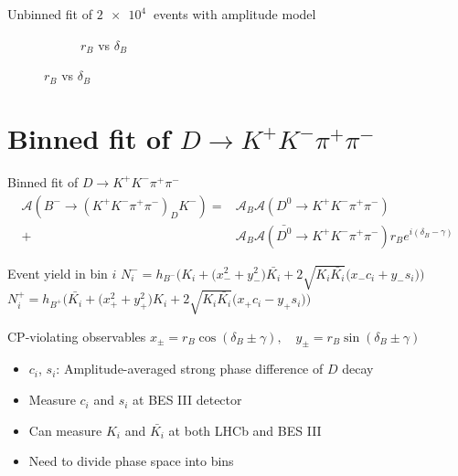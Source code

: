 \documentclass{beamer}
\begin{document}
\begin{frame}{Unbinned fit of $\SI{2e4}{}$ events with amplitude model}
\begin{figure}
\begin{subfigure}{0.46\textwidth}
      \caption{$r_B$ vs $\delta_B$}
    \end{subfigure}
  \end{figure}
\end{frame}

\section{Binned fit of \texorpdfstring{$D\to K^+K^-\pi^+\pi^-$}{D to K+K-pi+pi-}}
\begin{frame}{Binned fit of $D\to K^+K^-\pi^+\pi^-$}
  \vspace{-0.5cm}
  \begin{align*}
    \mathcal{A}(B^-\to(K^+K^-\pi^+\pi^-)_DK^-) =& \mathcal{A}_B\mathcal{A}(D^0\to K^+K^-\pi^+\pi^-) \\
  +& \mathcal{A}_B\mathcal{A}(\bar{D^0}\to K^+K^-\pi^+\pi^-)r_Be^{i(\delta_B - \gamma)}
  \end{align*}
  \vspace{-0.5cm}
  \begin{block}{Event yield in bin $i$}
    $N^-_i = h_{B^-}\Big(K_i + \big(x_-^2 + y_-^2\big)\bar{K_i} + 2\sqrt{K_i\bar{K_i}}\big(x_-c_i + y_-s_i\big)\Big)$
    $N^+_i = h_{B^+}\Big(\bar{K_i} + \big(x_+^2 + y_+^2\big)K_i + 2\sqrt{K_i\bar{K_i}}\big(x_+c_i - y_+s_i\big)\Big)$
  \end{block}
  \begin{block}{CP-violating observables}
    $x_\pm = r_B\cos(\delta_B\pm\gamma), \quad y_\pm = r_B\sin(\delta_B\pm\gamma)$
  \end{block}
  \begin{itemize}
    \item{$c_i$, $s_i$: Amplitude-averaged strong phase difference of $D$ decay}
    \item{Measure $c_i$ and $s_i$ at BES III detector}
    \item{Can measure $K_i$ and $\bar{K_i}$ at both LHCb and BES III}
    \item{Need to divide phase space into bins}
  \end{itemize}
\end{frame}
\end{document}
